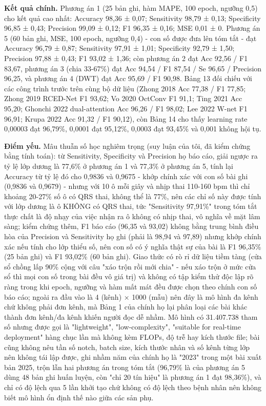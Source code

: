 \documentclass[12pt,a4paper]{article}
\begin{document}
\noindent \textbf{Kết quả chính.} Phương án 1 (25 bản ghi, hàm MAPE, 100 epoch, ngưỡng 0,5) cho kết quả cao nhất: Accuracy 98,36 ± 0,07; Sensitivity 98,79 ± 0,13; Specificity 96,85 ± 0,43; Precision 99,09 ± 0,12; F1 96,35 ± 0,16; MSE 0,01 ± 0. Phương án 5 (60 bản ghi, MSE, 100 epoch, ngưỡng 0,4) - con số được đưa lên tóm tắt - đạt Accuracy 96,79 ± 0,87; Sensitivity 97,91 ± 1,01; Specificity 92,79 ± 1,50; Precision 97,88 ± 0,43; F1 93,02 ± 1,36; còn phương án 2 đạt Acc 92,56 / F1 83,67, phương án 3 (chia 33-67\%) đạt Acc 94,54 / F1 87,54 / Se 96,65 / Precision 96,25, và phương án 4 (DWT) đạt Acc 95,69 / F1 90,98. Bảng 13 đối chiếu với các công trình trước trên cùng bộ dữ liệu (Zhong 2018 Acc 77,38 / F1 77,85; Zhong 2019 RCED-Net F1 93,62; Vo 2020 OctConv F1 91,1; Ting 2021 Acc 95,20; Ghonchi 2022 dual-attention Acc 96,26 / F1 98,02; Lee 2022 W-net F1 96,91; Krupa 2022 Acc 91,32 / F1 90,12), còn Bảng 14 cho thấy learning rate 0,00003 đạt 96,79\%, 0,0001 đạt 95,12\%, 0,0003 đạt 93,45\% và 0,001 không hội tụ.\par\vspace{3pt}
\noindent \textbf{Điểm yếu.} Mâu thuẫn số học nghiêm trọng (suy luận của tôi, đã kiểm chứng bằng tính toán): từ Sensitivity, Specificity và Precision họ báo cáo, giải ngược ra tỷ lệ lớp dương là 77,6\% ở phương án 1 và 77,3\% ở phương án 5, tính lại Accuracy từ tỷ lệ đó cho 0,9836 và 0,9675 - khớp chính xác với con số bài ghi (0,9836 và 0,9679) - nhưng với 10 ô mỗi giây và nhịp thai 110-160 bpm thì chỉ khoảng 20-27\% số ô có QRS thai, không thể là 77\%, nên các chỉ số này được tính với lớp dương là ô KHÔNG có QRS thai, tức "Sensitivity 97,91\%" trong tóm tắt thực chất là độ nhạy của việc nhận ra ô không có nhịp thai, vô nghĩa về mặt lâm sàng; kiểm chứng thêm, F1 báo cáo (96,35 và 93,02) không bằng trung bình điều hòa của Precision và Sensitivity họ ghi (phải là 98,94 và 97,89) nhưng khớp chính xác nếu tính cho lớp thiểu số, nên con số có ý nghĩa thật sự của bài là F1 96,35\% (25 bản ghi) và F1 93,02\% (60 bản ghi). Giao thức có rò rỉ dữ liệu tiềm tàng (cửa sổ chồng lấp 90\% cộng với câu "xáo trộn rồi mới chia" - nếu xáo trộn ở mức cửa sổ thì mọi con số trong bài đều vô giá trị) và không có tập kiểm thử độc lập rõ ràng trong khi epoch, ngưỡng và hàm mất mát đều được chọn theo chính con số báo cáo; ngoài ra đầu vào là 4 (kênh) × 1000 (mẫu) nên đây là mô hình đa kênh chứ không phải đơn kênh, mà Bảng 1 của chính họ lại phân loại các bài khác thành đơn kênh/đa kênh khiến người đọc dễ nhầm. Mô hình có 31.407.738 tham số nhưng được gọi là "lightweight", "low-complexity", "suitable for real-time deployment" hàng chục lần mà không kèm FLOPs, độ trễ hay kích thước file; bài cũng không nêu tần số notch, batch size, kích thước nhân và số kênh từng lớp nên không tái lập được, ghi nhầm năm của chính họ là "2023" trong một bài xuất bản 2025, trộn lẫn hai phương án trong tóm tắt (96,79\% là của phương án 5 dùng 48 bản ghi huấn luyện, còn "chỉ 20 tín hiệu" là phương án 1 đạt 98,36\%), và chỉ có độ lệch qua 5 lần khởi tạo chứ không có độ lệch theo bệnh nhân nên không biết mô hình ổn định thế nào giữa các sản phụ.\par\vspace{3pt}
\end{document}
